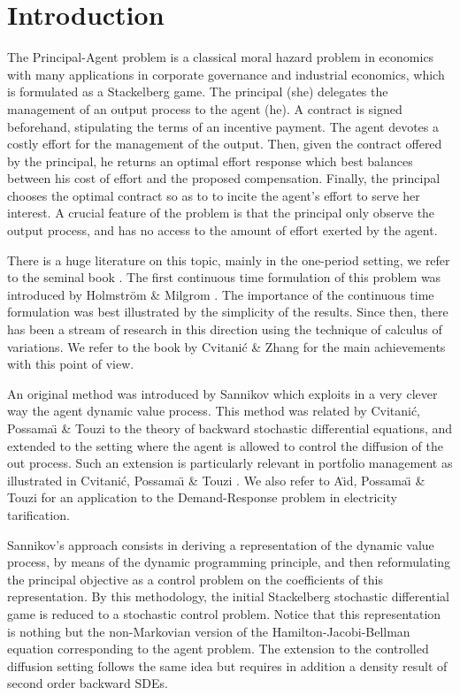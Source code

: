 \documentclass[11pt,a4paper]{article}
\numberwithin{equation}{section}
\theoremstyle{definition}
\begin{document}

\section{Introduction}

The Principal-Agent problem is a classical moral hazard problem in economics with many applications in corporate governance and industrial economics, which is formulated as a Stackelberg game. The principal (she) delegates the management of an output process to the agent (he). A contract is signed beforehand, stipulating the terms of an incentive payment. The agent devotes a costly effort for the management of the output. Then, given the contract offered by the principal, he returns an optimal effort response which best balances between his cost of effort and the proposed compensation. Finally, the principal chooses the optimal contract so as to to incite the agent's effort to serve her interest. A crucial feature of the problem is that the principal only observe the output process, and has no access to the amount of effort exerted by the agent.

There is a huge literature on this topic, mainly in the one-period setting, we refer to the seminal book \cite{BD05}. The first continuous time formulation of this problem was introduced by Holmstr\"{o}m \& Milgrom \cite{HM87}. The importance of the continuous time formulation was best illustrated by the simplicity of the results. Since then, there has been a stream of research in this direction using the technique of calculus of variations. We refer to the book by Cvitani\'c \& Zhang \cite{CZ12} for the main achievements with this point of view. 

An original method was introduced by Sannikov \cite{Sannikov08} which exploits in a very clever way the agent dynamic value process. This method was related by Cvitani\'c, Possama\"{\i} \& Touzi \cite{CPT18} to the theory of backward stochastic differential equations, and extended to the setting where the agent is allowed to control the diffusion of the out process. Such an extension is particularly relevant in portfolio management as illustrated in Cvitani\'c, Possama\"{\i} \& Touzi \cite{CPT17}. We also refer to A\"{\i}d, Possama\"{\i} \& Touzi \cite{APT19} for an application to the Demand-Response problem in electricity tarification.

Sannikov's approach consists in deriving a representation of the dynamic value process, by means of the dynamic programming principle, and then reformulating the principal objective as a control problem on the coefficients of this representation. By this methodology, the initial Stackelberg stochastic differential game is reduced to a stochastic control problem. Notice that this representation is nothing but the non-Markovian version of the Hamilton-Jacobi-Bellman equation corresponding to the agent problem. The extension to the controlled diffusion setting follows the same idea but requires in addition a density result of second order backward SDEs. 
\end{document}
